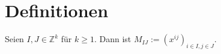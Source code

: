 \section{Definitionen}

\begin{definition}
    Seien $I,J \in \mathbb{Z}^k$ für $k \geq 1$. Dann ist $M_{IJ} := (x^{ij})_{i \in I, j \in J}$. 
\end{definition}